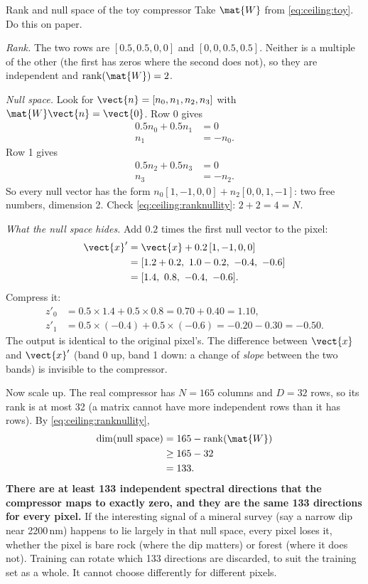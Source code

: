 \begin{worked}[label={we:ceiling:rank}]{Rank and null space of the toy compressor}
Take $\mat{W}$ from \cref{eq:ceiling:toy}. Do this on paper.

\emph{Rank.} The two rows are $[0.5, 0.5, 0, 0]$ and $[0, 0, 0.5, 0.5]$. Neither is a multiple of the other (the first has zeros where the second does not), so they are independent and $\operatorname{rank}(\mat{W}) = 2$.

\emph{Null space.} Look for $\vect{n} = [n_0, n_1, n_2, n_3]$ with $\mat{W}\vect{n} = \vect{0}$. Row 0 gives
\begin{align*}
  0.5 n_0 + 0.5 n_1 &= 0\\
  n_1 &= -n_0 .
\end{align*}
Row 1 gives
\begin{align*}
  0.5 n_2 + 0.5 n_3 &= 0\\
  n_3 &= -n_2 .
\end{align*}
So every null vector has the form $n_0[1,-1,0,0] + n_2[0,0,1,-1]$: two free numbers, dimension 2. Check \cref{eq:ceiling:ranknullity}: $2 + 2 = 4 = N$.

\emph{What the null space hides.} Add $0.2$ times the first null vector to the pixel:
\begin{align*}
  \vect{x}' &= \vect{x} + 0.2\,[1, -1, 0, 0]\\
            &= [1.2 + 0.2,\ 1.0 - 0.2,\ -0.4,\ -0.6]\\
            &= [1.4,\ 0.8,\ -0.4,\ -0.6].
\end{align*}
Compress it:
\begin{align*}
  z'_0 &= 0.5\times 1.4 + 0.5\times 0.8 = 0.70 + 0.40 = 1.10,\\
  z'_1 &= 0.5\times(-0.4) + 0.5\times(-0.6) = -0.20 - 0.30 = -0.50.
\end{align*}
The output is identical to the original pixel's. The difference between $\vect{x}$ and $\vect{x}'$ (band 0 up, band 1 down: a change of \emph{slope} between the two bands) is invisible to the compressor.
\end{worked}

Now scale up. The real compressor has $N = 165$ columns and $D = 32$ rows, so its rank is at most 32 (a matrix cannot have more independent rows than it has rows). By \cref{eq:ceiling:ranknullity},
\begin{align*}
  \dim(\text{null space}) &= 165 - \operatorname{rank}(\mat{W})\\
  &\geq 165 - 32\\
  &= 133 .
\end{align*}
\textbf{There are at least 133 independent spectral directions that the compressor maps to exactly zero, and they are the same 133 directions for every pixel.} If the interesting signal of a mineral survey (say a narrow dip near 2200\,nm) happens to lie largely in that null space, every pixel loses it, whether the pixel is bare rock (where the dip matters) or forest (where it does not). Training can rotate which 133 directions are discarded, to suit the training set as a whole. It cannot choose differently for different pixels.

